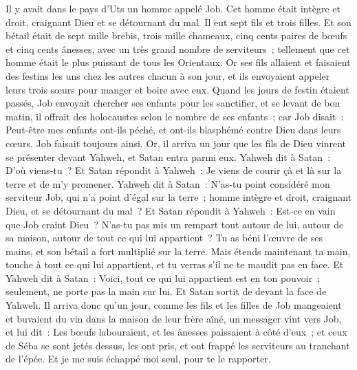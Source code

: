 \begin{multicols}{2}
\VerseOne{}Il y avait dans le pays d'Uts un homme appelé Job. Cet homme était intègre et droit, craignant Dieu et se détournant du mal.
Il eut sept fils et trois filles.
Et son bétail était de sept mille brebis, trois mille chameaux, cinq cents paires de bœufs et cinq cents ânesses, avec un très grand nombre de serviteurs~; tellement que cet homme était le plus puissant de tous les Orientaux.
Or ses fils allaient et faisaient des festins les uns chez les autres chacun à son jour, et ils envoyaient appeler leurs trois sœurs pour manger et boire avec eux.
Quand les jours de festin étaient passés, Job envoyait chercher ses enfants pour les sanctifier, et se levant de bon matin, il offrait des holocaustes selon le nombre de ses enfants~; car Job disait~: Peut-être mes enfants ont-ils péché, et ont-ils blasphémé contre Dieu dans leurs cœurs. Job faisait toujours ainsi.
Or, il arriva un jour que les fils de Dieu vinrent se présenter devant Yahweh, et Satan entra parmi eux.
Yahweh dit à Satan~: D'où viens-tu~? Et Satan répondit à Yahweh~: Je viens de courir çà et là sur la terre et de m'y promener.
Yahweh dit à Satan~: N'as-tu point considéré mon serviteur Job, qui n'a point d'égal sur la terre~; homme intègre et droit, craignant Dieu, et se détournant du mal~?
Et Satan répondit à Yahweh~: Est-ce en vain que Job craint Dieu~?
N'as-tu pas mis un rempart tout autour de lui, autour de sa maison, autour de tout ce qui lui appartient~? Tu as béni l'œuvre de ses mains, et son bétail a fort multiplié sur la terre.
Mais étends maintenant ta main, touche à tout ce qui lui appartient, et tu verras s'il ne te maudit pas en face.
Et Yahweh dit à Satan~: Voici, tout ce qui lui appartient est en ton pouvoir~; seulement, ne porte pas la main sur lui. Et Satan sortit de devant la face de Yahweh.
Il arriva donc qu'un jour, comme les fils et les filles de Job mangeaient et buvaient du vin dans la maison de leur frère aîné, un messager vint vers Job,
et lui dit~: Les bœufs labouraient, et les ânesses paissaient à côté d'eux~;
et ceux de Séba se sont jetés dessus, les ont pris, et ont frappé les serviteurs au tranchant de l'épée. Et je me suis échappé moi seul, pour te le rapporter.

\end{multicols}
